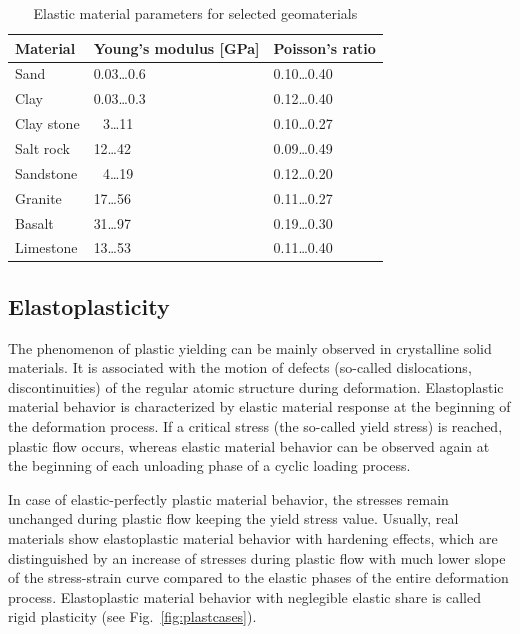 \renewcommand{\arraystretch}{1.25}
\begin{table}[htb!]
\caption{Elastic material parameters for selected geomaterials}
\label{tab:rockelastpar}
\begin{center}
\begin{tabular}{|p{}||p{}|p{}|}
\hline
Material & Young's modulus [GPa] & Poisson's ratio \\
\hline\hline
Sand       & 0.03\dots 0.6 & 0.10\dots 0.40 \\
\hline
Clay       & 0.03\dots 0.3 & 0.12\dots 0.40\\
\hline\hline
Clay stone & \ \,3\dots 11   & 0.10\dots 0.27 \\
\hline
Salt rock  & 12\dots 42  & 0.09\dots 0.49 \\
\hline
Sandstone  & \ \,4\dots 19   & 0.12\dots 0.20 \\
\hline
Granite    & 17\dots 56  & 0.11\dots 0.27 \\
\hline
Basalt     & 31\dots 97  & 0.19\dots 0.30 \\
\hline
Limestone  & 13\dots 53  & 0.11\dots 0.40 \\
\hline
\end{tabular}
\end{center}
\end{table}
\renewcommand{\arraystretch}{1.00}

\subsection{Elastoplasticity}
\label{sec:elastoplast}

The phenomenon of plastic yielding can be mainly observed in crystalline solid materials. It is associated with the motion of defects
(so-called dislocations, discontinuities) of the regular atomic structure during deformation. Elastoplastic material behavior is
characterized by elastic material response at the beginning of the deformation process. If a critical stress (the so-called yield stress)
is reached, plastic flow occurs, whereas elastic material behavior can be observed again at the beginning of each unloading phase of a
cyclic loading process.

In case of elastic-perfectly plastic material behavior, the stresses remain unchanged during plastic flow keeping the yield stress value.
Usually, real materials show elastoplastic material behavior with hardening effects, which are distinguished by an increase of stresses
during plastic flow with much lower slope of the stress-strain curve compared to the elastic phases of the entire deformation process.
Elastoplastic material behavior with neglegible elastic share is called rigid plasticity (see Fig.~\ref{fig:plastcases}).

